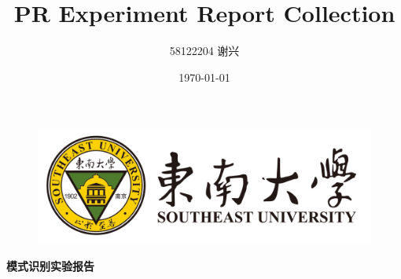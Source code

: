\documentclass[12pt]{article}
\title{\textbf{PR Experiment Report Collection}}
\author{58122204 谢兴}
\date{\today}
\begin{document}
\begin{titlepage}
  \begin{figure}[htbp]
    \centering
    \includegraphics[scale=0.2]{figures/southeast_university_logo.png}
    \label{fig1}
  \end{figure}

  \centering
  \vspace*{40pt}
  \Huge\textbf{模式识别实验报告}

  \vspace{60pt}
  \Large







  \begin{center}


\end{center}
\end{titlepage}
\end{document}
